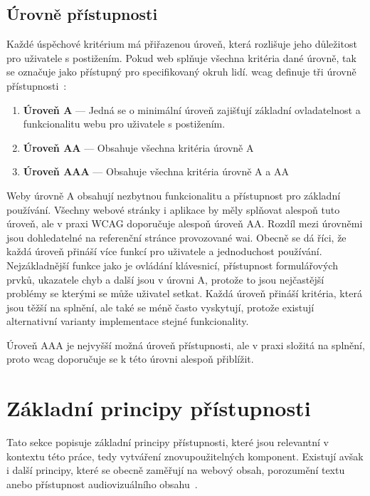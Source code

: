 \subsection{Úrovně přístupnosti}

Každé úspěchové kritérium má přiřazenou úroveň, která rozlišuje jeho důležitost pro uživatele s postižením.
Pokud web splňuje všechna kritéria dané úrovně, tak se označuje jako přístupný pro specifikovaný okruh lidí.
\gls{wcag} definuje tři úrovně přístupnosti~\cite[Sekce 5.2.1]{wcag}:

\begin{enumerate}
  \item \textbf{Úroveň A} --- Jedná se o minimální úroveň zajišťují základní ovladatelnost a funkcionalitu webu pro uživatele s postižením.
  \item \textbf{Úroveň AA} --- Obsahuje všechna kritéria úrovně A
  \item \textbf{Úroveň AAA} --- Obsahuje všechna kritéria úrovně A a AA
\end{enumerate}

Weby úrovně A obsahují nezbytnou funkcionalitu a přístupnost pro základní používání.
Všechny webové stránky i aplikace by měly splňovat alespoň tuto úroveň, ale v praxi WCAG doporučuje alespoň úroveň AA.
Rozdíl mezi úrovněmi jsou dohledatelné na referenční stránce provozované \gls{wai}.
Obecně se dá říci, že každá úroveň přináší více funkcí pro uživatele a jednoduchost používání.
Nejzákladnější funkce jako je ovládání klávesnicí, přístupnost formulářových prvků, ukazatele chyb a další jsou v úrovni A, protože to jsou nejčastější problémy se kterými se může uživatel setkat.
Každá úroveň přináší kritéria, která jsou těžší na splnění, ale také se méně často vyskytují, protože existují alternativní varianty implementace stejné funkcionality.

Úroveň AAA je nejvyšší možná úroveň přístupnosti, ale v praxi složitá na splnění, proto \gls{wcag} doporučuje se k této úrovni alespoň přiblížit.

\section{Základní principy přístupnosti}


Tato sekce popisuje základní principy přístupnosti, které jsou relevantní v kontextu této práce, tedy vytváření znovupoužitelných komponent.
Existují avšak i další principy, které se obecně zaměřují na webový obsah, porozumění textu anebo přístupnost audiovizuálního obsahu~\cite{w3-accessibility-principles}.

